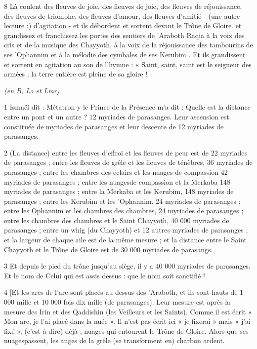 \par 8 Là coulent des fleuves de joie, des fleuves de joie, des fleuves de réjouissance, des fleuves de triomphe, des fleuves d'amour, des fleuves d'amitié - (une autre lecture :) d'agitation - et ils débordent et sortent devant le Trône de Gloire. et grandissez et franchissez les portes des sentiers de 'Araboth Raqia à la voix des cris et de la musique des Chayyoth, à la voix de la réjouissance des tambourins de ses 'Ophannim et à la mélodie des cymbales de ses Kerubim . Et ils grandissent et sortent en agitation au son de l'hymne : « Saint, saint, saint est le seigneur des armées ; la terre entière est pleine de sa gloire !


\par \textit{(en B, Lo et Lmr)}

\par 1 Ismaël dit : Métatron y le Prince de la Présence m'a dit : Quelle est la distance entre un pont et un autre ? 12 myriades de parasanges. Leur ascension est constituée de myriades de parasanges et leur descente de 12 myriades de parasanges.

\par 2 (La distance) entre les fleuves d'effroi et les fleuves de peur est de 22 myriades de parasanges ; entre les fleuves de grêle et les fleuves de ténèbres, 36 myriades de parasanges ; entre les chambres des éclairs et les nuages ​​de compassion 42 myriades de parasanges ; entre les nuages ​​de compassion et la Merkaba 148 myriades de parasanges ; entre la Merkaba et les Kerubim, 148 myriades de parasanges ; entre les Kerubim et les 'Ophannim, 24 myriades de parasanges ; entre les Ophannim et les chambres des chambres, 24 myriades de parasanges ; entre les chambres des chambres et le Saint Chayyoth, 40 000 myriades de parasanges ; entre un whig (du Chayyoth) et 12 autres myriades de parasanges ; et la largeur de chaque aile est de la même mesure ; et la distance entre le Saint Chayyoth et le Trône de Gloire est de 30 000 myriades de parasangs.

\par 3 Et depuis le pied du trône jusqu'au siège, il y a 40 000 myriades de parasanges. Et le nom de Celui qui est assis dessus : que le nom soit sanctifié !

\par 4 [Et les arcs de l'arc sont placés au-dessus des 'Araboth, et ils sont hauts de 1 000 mille et 10 000 fois dix mille (de parasanges). Leur mesure est après la mesure des Irin et des Qaddishin (les Veilleurs et les Saints). Comme il est écrit « Mon arc, je l'ai placé dans la nuée ». Il n'est pas écrit ici « je fixerai » mais « j'ai fixé », (c'est-à-dire) déjà ; nuages ​​qui entourent le Trône de Gloire. Alors que ses nuages ​​passent, les anges de la grêle (se transforment en) charbon ardent.

